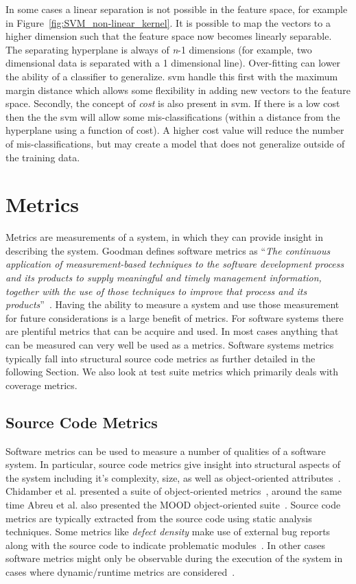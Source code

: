 In some cases a linear separation is not possible in the feature space, for example in Figure~\ref{fig:SVM_non-linear_kernel}. It is possible to map the vectors to a higher dimension such that the feature space now becomes linearly separable. The separating hyperplane is always of \emph{n}-1 dimensions (for example, two dimensional data is separated with a 1 dimensional line). Over-fitting can lower the ability of a classifier to generalize. \gls{svm} handle this first with the maximum margin distance which allows some flexibility in adding new vectors to the feature space. Secondly, the concept of \emph{cost} is also present in \gls{svm}. If there is a low cost then the the \gls{svm} will allow some mis-classifications (within a distance from the hyperplane using a function of cost). A higher cost value will reduce the number of mis-classifications, but may create a model that does not generalize outside of the training data.



\section{Metrics}
\label{sec:background_metrics}
Metrics are measurements of a system, in which they can provide insight in describing the system. Goodman defines software metrics as ``\emph{The continuous application of measurement-based techniques to the software development process and its products to supply meaningful and timely management information, together with the use of those techniques to improve that process and its products}''~\cite{Goo93}. Having the ability to measure a system and use those measurement for future considerations is a large benefit of metrics. For software systems there are plentiful metrics that can be acquire and used. In most cases anything that can be measured can very well be used as a metrics. Software systems metrics typically fall into structural source code metrics as further detailed in the following Section. We also look at test suite metrics which primarily deals with coverage metrics.


\subsection{Source Code Metrics}
\label{subsec:background_source_code_metrics}
Software metrics can be used to measure a number of qualities of a software system. In particular, source code metrics give insight into structural aspects of the system including it's complexity, size, as well as object-oriented attributes~\cite{McCa76, Kan02, HWY09, Hend95, SRD12}. Chidamber et al. presented a suite of object-oriented metrics~\cite{CK94}, around the same time Abreu et al. also presented the MOOD object-oriented suite~\cite{AC94}. Source code metrics are typically extracted from the source code using static analysis techniques. Some metrics like \emph{defect density} make use of external bug reports along with the source code to indicate problematic modules~\cite{FP98}. In other cases software metrics might only be observable during the execution of the system in cases where dynamic/runtime metrics are considered~\cite{SS08}.

